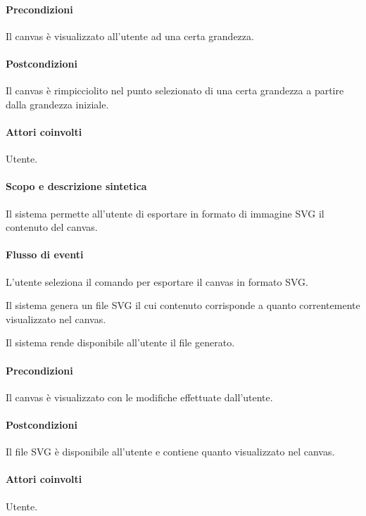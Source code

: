 \paragraph{Precondizioni} Il canvas \`e visualizzato all'utente ad una certa grandezza.
\paragraph{Postcondizioni} Il canvas \`e rimpicciolito nel punto selezionato di una certa grandezza a partire dalla grandezza iniziale.

\paragraph{Attori coinvolti} Utente.
\paragraph{Scopo e descrizione sintetica} 
Il sistema permette all'utente di esportare in formato di immagine SVG il contenuto del canvas.
\paragraph{Flusso di eventi}
\begin{elenconumerato}[\textbf{}]{\subsubsecindent}
\item L'utente seleziona il comando per esportare il canvas in formato SVG.
\item Il sistema genera un file SVG il cui contenuto corrisponde a quanto correntemente visualizzato nel canvas.
\item Il sistema rende disponibile all'utente il file generato.
\end{elenconumerato}
\paragraph{Precondizioni} Il canvas \`e visualizzato con le modifiche effettuate dall'utente.
\paragraph{Postcondizioni} Il file SVG \`e disponibile all'utente e contiene quanto visualizzato nel canvas.

\paragraph{Attori coinvolti} Utente.
